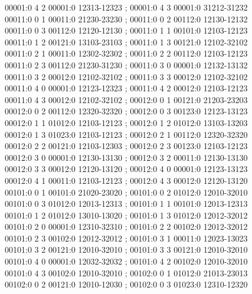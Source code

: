 \documentclass[11pt]{article}
\theoremstyle{remark}
\numberwithin{equation}{section}
\numberwithin{table}{section}
\begin{document}
\begin{flushleft}
00001:0 4 2 00001:0 12313-12323 ; 00001:0 4 3 00001:0 31212-31232\\
00011:0 0 1 00011:0 21230-23230 ; 00011:0 0 2 00112:0 12130-12132\\
00011:0 0 3 00112:0 12120-12130 ; 00011:0 1 1 00101:0 12103-12123\\
00011:0 1 2 00121:0 13103-23103 ; 00011:0 1 3 00121:0 12102-32102\\
00011:0 2 1 00011:0 12302-32302 ; 00011:0 2 2 00112:0 12103-12123\\
00011:0 2 3 00112:0 21230-31230 ; 00011:0 3 0 00001:0 12132-13132\\
00011:0 3 2 00012:0 12102-32102 ; 00011:0 3 3 00012:0 12102-32102\\
00011:0 4 0 00001:0 12123-12323 ; 00011:0 4 2 00012:0 12103-12123\\
00011:0 4 3 00012:0 12102-32102 ; 00012:0 0 1 00121:0 21203-23203\\
00012:0 0 2 00112:0 12320-32320 ; 00012:0 0 3 00123:0 12123-13123\\
00012:0 1 1 01012:0 12103-12123 ; 00012:0 1 2 01012:0 13103-13203\\
00012:0 1 3 01023:0 12103-12123 ; 00012:0 2 1 00112:0 12320-32320\\
00012:0 2 2 00121:0 12103-12303 ; 00012:0 2 3 00123:0 12103-12123\\
00012:0 3 0 00001:0 12130-13130 ; 00012:0 3 2 00011:0 12130-13130\\
00012:0 3 3 00012:0 12120-13120 ; 00012:0 4 0 00001:0 12123-13123\\
00012:0 4 1 00011:0 12103-12123 ; 00012:0 4 3 00012:0 12120-13120\\
00101:0 0 1 00101:0 21020-23020 ; 00101:0 0 2 01012:0 12010-32010\\
00101:0 0 3 01012:0 12013-12313 ; 00101:0 1 1 00101:0 12013-12313\\
00101:0 1 2 01012:0 13010-13020 ; 00101:0 1 3 01012:0 12012-32012\\
00101:0 2 0 00001:0 12310-32310 ; 00101:0 2 2 00102:0 12012-32012\\
00101:0 2 3 00102:0 12012-32012 ; 00101:0 3 1 00011:0 12023-13023\\
00101:0 3 2 00121:0 12010-32010 ; 00101:0 3 3 00121:0 12010-32010\\
00101:0 4 0 00001:0 12032-32032 ; 00101:0 4 2 00102:0 12010-32010\\
00101:0 4 3 00102:0 12010-32010 ; 00102:0 0 1 01012:0 21013-23013\\
00102:0 0 2 00121:0 12010-12030 ; 00102:0 0 3 01023:0 12310-12320\\

\end{flushleft}
\end{document}
